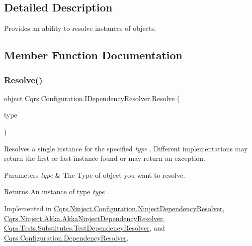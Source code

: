 \subsection{Detailed Description}
Provides an ability to resolve instances of objects. 



\subsection{Member Function Documentation}
\mbox{\label{interfaceCqrs_1_1Configuration_1_1IDependencyResolver_aa455096b7b94fc1d64904bc67830ec06_aa455096b7b94fc1d64904bc67830ec06}} 
\subsubsection{\texorpdfstring{Resolve()}{Resolve()}}
{\footnotesize\ttfamily object Cqrs.\+Configuration.\+I\+Dependency\+Resolver.\+Resolve (\begin{DoxyParamCaption}\item[{Type}]{type }\end{DoxyParamCaption})}



Resolves a single instance for the specified {\itshape type} . Different implementations may return the first or last instance found or may return an exception. 


\begin{DoxyParams}{Parameters}
{\em type} & The Type of object you want to resolve.\\
\hline
\end{DoxyParams}
\begin{DoxyReturn}{Returns}
An instance of type {\itshape type} .
\end{DoxyReturn}


Implemented in \hyperlink{classCqrs_1_1Ninject_1_1Configuration_1_1NinjectDependencyResolver_ab9da7f1556cc1ef205d03d3ff62017c0_ab9da7f1556cc1ef205d03d3ff62017c0}{Cqrs.\+Ninject.\+Configuration.\+Ninject\+Dependency\+Resolver}, \hyperlink{classCqrs_1_1Ninject_1_1Akka_1_1AkkaNinjectDependencyResolver_adace29de71f10e34e952bd41e48106a6_adace29de71f10e34e952bd41e48106a6}{Cqrs.\+Ninject.\+Akka.\+Akka\+Ninject\+Dependency\+Resolver}, \hyperlink{classCqrs_1_1Tests_1_1Substitutes_1_1TestDependencyResolver_a05767824475ea6affbf6f70cf5b1fd06_a05767824475ea6affbf6f70cf5b1fd06}{Cqrs.\+Tests.\+Substitutes.\+Test\+Dependency\+Resolver}, and \hyperlink{classCqrs_1_1Configuration_1_1DependencyResolver_aaeeb3ad2e0ef44bd98469d843210205c_aaeeb3ad2e0ef44bd98469d843210205c}{Cqrs.\+Configuration.\+Dependency\+Resolver}.

